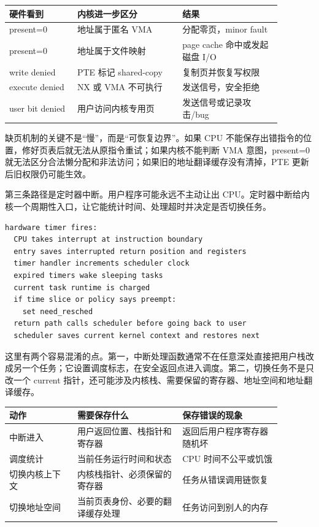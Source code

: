 \begin{longtable}{|p{0.22\linewidth}|p{0.34\linewidth}|p{0.32\linewidth}|}
\toprule
硬件看到 & 内核进一步区分 & 结果 \\
\midrule
present=0 & 地址属于匿名 VMA & 分配零页，minor fault \\\tablerowrule
present=0 & 地址属于文件映射 & page cache 命中或发起磁盘 I/O \\\tablerowrule
write denied & PTE 标记 shared-copy & 复制页并恢复写权限 \\\tablerowrule
execute denied & NX 或 VMA 不可执行 & 发送信号，安全拒绝 \\\tablerowrule
user bit denied & 用户访问内核专用页 & 发送信号或记录攻击/bug \\
\bottomrule
\end{longtable}

缺页机制的关键不是“慢”，而是“可恢复边界”。如果 CPU 不能保存出错指令的位置，修好页表后就无法从原指令重试；如果内核不能判断 VMA 意图，present=0 就无法区分合法懒分配和非法访问；如果旧的地址翻译缓存没有清掉，PTE 更新后旧权限仍可能生效。

第三条路径是定时器中断。用户程序可能永远不主动让出 CPU。定时器中断给内核一个周期性入口，让它能统计时间、处理超时并决定是否切换任务。

\begin{lstlisting}
hardware timer fires:
  CPU takes interrupt at instruction boundary
  entry saves interrupted return position and registers
  timer handler increments scheduler clock
  expired timers wake sleeping tasks
  current task runtime is charged
  if time slice or policy says preempt:
    set need_resched
  return path calls scheduler before going back to user
  scheduler saves current kernel context and restores next
\end{lstlisting}

这里有两个容易混淆的点。第一，中断处理函数通常不在任意深处直接把用户栈改成另一个任务；它设置调度标志，在安全返回点进入调度。第二，切换任务不是只改一个 current 指针，还可能涉及内核栈、需要保留的寄存器、地址空间和地址翻译缓存。

\begin{longtable}{|p{0.22\linewidth}|p{0.34\linewidth}|p{0.32\linewidth}|}
\toprule
动作 & 需要保存什么 & 保存错误的现象 \\
\midrule
中断进入 & 用户返回位置、栈指针和寄存器 & 返回后用户程序寄存器随机坏 \\\tablerowrule
调度统计 & 当前任务运行时间和状态 & CPU 时间不公平或饥饿 \\\tablerowrule
切换内核上下文 & 内核栈指针、必须保留的寄存器 & 任务从错误调用链恢复 \\\tablerowrule
切换地址空间 & 当前页表身份、必要的翻译缓存处理 & 任务访问到别人的内存 \\
\bottomrule
\end{longtable}

